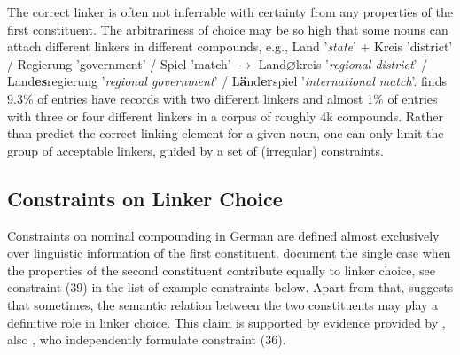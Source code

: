 \documentclass[10pt, a4paper]{article}
\newcommand{\zeroLinker}{\ensuremath{\boldsymbol{\varnothing}}}
\begin{document}

The correct linker is often not inferrable with certainty from any properties of the first constituent. The arbitrariness of choice may be so high that some nouns can attach different linkers in different compounds, e.g., Land '\textit{state}' + Kreis 'district' / Regierung 'government' / Spiel 'match' $\rightarrow$ Land{\zeroLinker}kreis '\textit{regional district}' / Land{\textbf{es}}regierung '\textit{regional government}' / L\textbf{ä}nd{\textbf{er}}spiel '\textit{international match}'. \citet[134]{augst_1975} finds 9.3\% of entries have records with two different linkers and almost 1\% of entries with three or four different linkers in a corpus of roughly 4k compounds. Rather than predict the correct linking element for a given noun, one can only limit the group of acceptable linkers, guided by a set of (irregular) constraints.


\subsection{Constraints on Linker Choice}
\label{sec:constr}

Constraints on nominal compounding in German are defined almost exclusively over linguistic information of the first constituent. \citet[56]{ortner_mueller-bollhagen_1991} document the single case when the properties of the second constituent contribute equally to linker choice, see constraint (39) in the list of example constraints below. Apart from that, \citet[227]{eisenberg_2013} suggests that sometimes, the semantic relation between the two constituents may play a definitive role in linker choice. This claim is supported by evidence provided by \citet{koliopoulou_2014}, also \citet{neef_borgwaldt_2012}, who independently formulate constraint (36).
\end{document}
